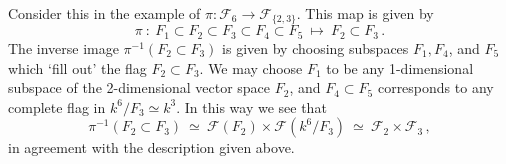 \documentclass[12pt]{amsart}
\begin{document}
Consider this in the example of 
$\pi\colon{\mathcal F}_6\to {\mathcal F}_{\{2,3\}}$.
This map is given by 
$$
  \pi\ \colon\ 
  F_1\subset F_2\subset F_3\subset F_4\subset F_5\ \longmapsto\ 
  F_2\subset F_3\,.
$$
The inverse image $\pi^{-1}(F_2\subset F_3)$ is given by choosing
subspaces $F_1,F_4$, and $F_5$ which `fill out' the flag 
$F_2\subset F_3$.
We may choose $F_1$ to be any 1-dimensional subspace of the 2-dimensional
vector space $F_2$, and $F_4\subset F_5$ corresponds to any complete flag in 
$k^6/F_3\simeq k^3$.
In this way we see that 
$$
\pi^{-1}(F_2\subset F_3)\ \simeq\  
   {\mathcal F}(F_2)\times {\mathcal F}(k^6/F_3)\ \simeq\ 
   {\mathcal F}_2\times {\mathcal F}_3\,,
$$
in agreement with the description given above.
\end{document}
